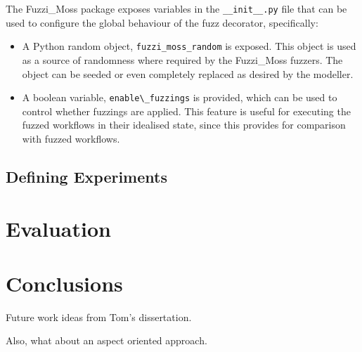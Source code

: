 \documentclass{sig-alternate}
\begin{document}

The Fuzzi\_Moss package exposes variables in the \verb!__init__.py! file that
can be used to configure the global behaviour of the fuzz decorator,
specifically:

\begin{itemize}
\item A Python random object, \lstinline!fuzzi_moss_random! is exposed.  This
  object is used as a source of randomness where required by the Fuzzi\_Moss
  fuzzers.  The object can be seeded or even completely replaced as desired by
  the modeller.

\item A boolean variable, \lstinline!enable\_fuzzings! is provided, which can be
  used to control whether fuzzings are applied.  This feature is useful for
  executing the fuzzed workflows in their idealised state, since this provides
  for comparison with fuzzed workflows.

\end{itemize}



\subsection{Defining Experiments}






\section{Evaluation}
\label{sec:evaluation}



\section{Conclusions}
\label{sec:conclusions}


Future work ideas from Tom's dissertation.

Also, what about an aspect oriented approach.








\end{document}
